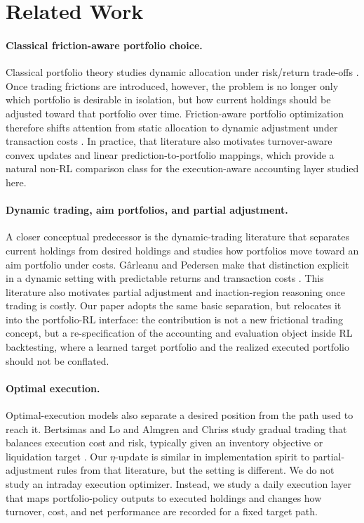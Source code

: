 \documentclass[10pt,twocolumn]{article}
\begin{document}
\section{Related Work}
\paragraph{Classical friction-aware portfolio choice.}
Classical portfolio theory studies dynamic allocation under risk/return trade-offs \cite{markowitz1952,merton1973}. Once trading frictions are introduced, however, the problem is no longer only which portfolio is desirable in isolation, but how current holdings should be adjusted toward that portfolio over time. Friction-aware portfolio optimization therefore shifts attention from static allocation to dynamic adjustment under transaction costs \cite{lobo2007,garleanu2013}. In practice, that literature also motivates turnover-aware convex updates and linear prediction-to-portfolio mappings, which provide a natural non-RL comparison class for the execution-aware accounting layer studied here.

\paragraph{Dynamic trading, aim portfolios, and partial adjustment.}
A closer conceptual predecessor is the dynamic-trading literature that separates current holdings from desired holdings and studies how portfolios move toward an aim portfolio under costs. G\^arleanu and Pedersen make that distinction explicit in a dynamic setting with predictable returns and transaction costs \cite{garleanu2013}. This literature also motivates partial adjustment and inaction-region reasoning once trading is costly. Our paper adopts the same basic separation, but relocates it into the portfolio-RL interface: the contribution is not a new frictional trading concept, but a re-specification of the accounting and evaluation object inside RL backtesting, where a learned target portfolio and the realized executed portfolio should not be conflated.

\paragraph{Optimal execution.}
Optimal-execution models also separate a desired position from the path used to reach it. Bertsimas and Lo and Almgren and Chriss study gradual trading that balances execution cost and risk, typically given an inventory objective or liquidation target \cite{bertsimas1998,almgren2000}. Our $\eta$-update is similar in implementation spirit to partial-adjustment rules from that literature, but the setting is different. We do not study an intraday execution optimizer. Instead, we study a daily execution layer that maps portfolio-policy outputs to executed holdings and changes how turnover, cost, and net performance are recorded for a fixed target path.
\end{document}
